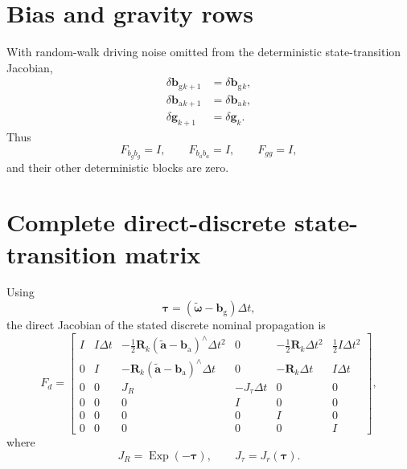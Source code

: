 \documentclass[11pt]{article}
\newcommand{\R}{\mathbf{R}}
\newcommand{\bg}{\mathbf{b}_{\mathrm{g}}}
\newcommand{\ba}{\mathbf{b}_{\mathrm{a}}}
\newcommand{\g}{\mathbf{g}}
\newcommand{\Exp}{\operatorname{Exp}}
\newcommand{\skewop}[1]{#1^{\wedge}}
\newcommand{\atilde}{\tilde{\mathbf{a}}}
\newcommand{\omegatilde}{\tilde{\bm\omega}}
\begin{document}
\section{Bias and gravity rows}
With random-walk driving noise omitted from the deterministic state-transition Jacobian,
\begin{align}
\delta\bg{}_{k+1}&=\delta\bg{}_k,\\
\delta\ba{}_{k+1}&=\delta\ba{}_k,\\
\delta\g_{k+1}&=\delta\g_k.
\end{align}
Thus
\begin{equation}
F_{b_gb_g}=I,\qquad
F_{b_ab_a}=I,\qquad
F_{gg}=I,
\end{equation}
and their other deterministic blocks are zero.

\section{Complete direct-discrete state-transition matrix}
Using
\begin{equation}
\bm\tau=(\omegatilde-\bg)\Delta t,
\end{equation}
the direct Jacobian of the stated discrete nominal propagation is
\begin{equation}
\boxed{
F_d=
\begin{bmatrix}
I & I\Delta t & -\frac12\R_k\skewop{(\atilde-\ba)}\Delta t^2 & 0 & -\frac12\R_k\Delta t^2 & \frac12I\Delta t^2\\
0 & I & -\R_k\skewop{(\atilde-\ba)}\Delta t & 0 & -\R_k\Delta t & I\Delta t\\
0 & 0 & J_R & -J_\tau\Delta t & 0 & 0\\
0 & 0 & 0 & I & 0 & 0\\
0 & 0 & 0 & 0 & I & 0\\
0 & 0 & 0 & 0 & 0 & I
\end{bmatrix},
}
\end{equation}
where
\begin{equation}
J_R=\Exp(-\bm\tau),
\qquad
J_\tau=J_r(\bm\tau).
\end{equation}
\end{document}
